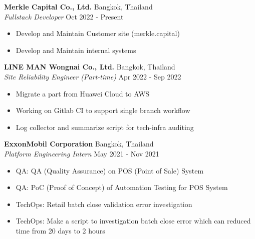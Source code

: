 \textbf{Merkle Capital Co., Ltd.} \hfill Bangkok, Thailand\\
\textit{Fullstack Developer} \hfill Oct 2022 - Present\\
\vspace{-1mm}
\begin{itemize} \itemsep 1pt
	\item Develop and Maintain Customer site (merkle.capital)
	\item Develop and Maintain internal systems
\end{itemize}
\textbf{LINE MAN Wongnai Co., Ltd.} \hfill Bangkok, Thailand\\
\textit{Site Reliability Engineer (Part-time)} \hfill Apr 2022 - Sep 2022\\
\vspace{-1mm}
\begin{itemize} \itemsep 1pt
	\item Migrate a part from Huawei Cloud to AWS
	\item Working on Gitlab CI to support single branch workflow
	\item Log collector and summarize script for tech-infra auditing
\end{itemize}
\textbf{ExxonMobil Corporation} \hfill Bangkok, Thailand\\
\textit{Platform Engineering Intern} \hfill May 2021 - Nov 2021\\
\vspace{-1mm}
\begin{itemize} \itemsep 1pt
	\item QA: QA (Quality Assurance) on POS (Point of Sale) System
	\item QA: PoC (Proof of Concept) of Automation Testing for POS System
	\item TechOps: Retail batch close validation error investigation
	\item TechOps: Make a script to investigation batch close error which can reduced time from 20 days to 2 hours
\end{itemize}

